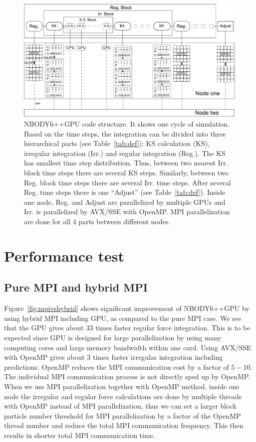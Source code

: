 \documentclass[usenatbib,aas_macros]{mn2e}
\def\nbodyppgpu{NBODY6++GPU }
\begin{document}
\begin{figure}
  \centering
  \includegraphics[width=1.0\textwidth,height=!]{nbodystructure.eps}
  \caption{\nbodyppgpu code structure. It shows one cycle of simulation. Based on the time steps, the integration can be divided into three hierarchical parts (see Table~\ref{tab:def}): KS calculation (KS), irregular integration (Irr.) and regular integration (Reg.). 
The KS has smallest time step distribution. 
Thus, between two nearest Irr. block time steps there are several KS steps.
Similarly, between two Reg. block time steps there are several Irr. time steps.
After several Reg. time steps there is one ``Adjust'' (see Table~\ref{tab:def}). 
Inside one node, Reg. and Adjust are parallelized by multiple GPUs and Irr. is parallelized by AVX/SSE with OpenMP. 
MPI parallelization are done for all 4 parts between different nodes.
}
  \label{fig:structure}
\end{figure}

\section{Performance test}
\label{sec:performance}

\subsection{ Pure MPI and hybrid MPI}

Figure~\ref{fig:mpivshybrid} shows significant improvement of \nbodyppgpu by using hybrid MPI including GPU, as compared to the pure MPI case. 
We see that the GPU gives about $33$ times faster regular force integration.
This is to be expected since GPU is designed for large parallelization by using many computing cores and large memory bandwidth within one card. 
Using AVX/SSE with OpenMP gives about $3$ times faster irregular integration including predictions. 
OpenMP reduces the MPI communication cost by a factor of $5-10$.
The individual MPI communication process is not directly sped up by OpenMP. 
When we use MPI parallelization together with OpenMP method, inside one node the irregular and regular force calculations are done by multiple threads with OpenMP instead of MPI parallelization, thus we can set a larger block particle number threshold for MPI parallelization by a factor of the OpenMP thread number and reduce the total MPI communication frequency. 
This then results in shorter total MPI communication time.
\end{document}
